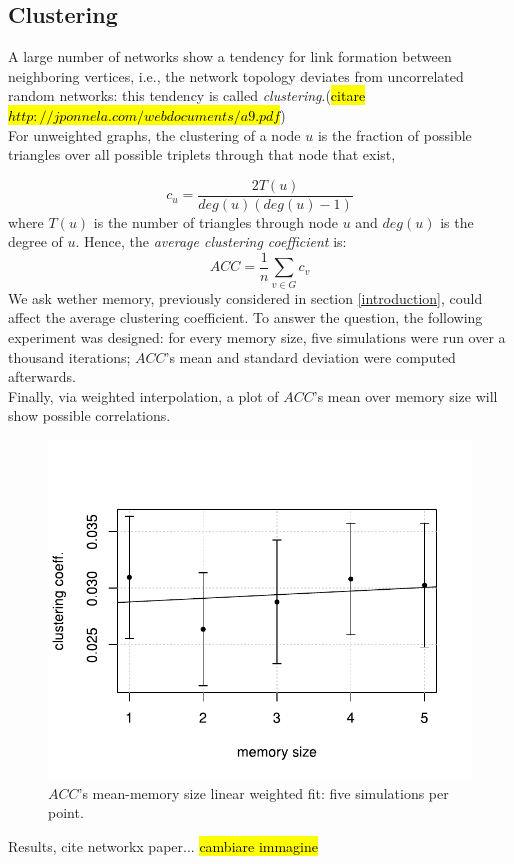 \subsection{Clustering} \label{clustering}
A large number of networks show a tendency for link formation between neighboring vertices, i.e., the network topology deviates from uncorrelated random networks: this tendency is called \textit{clustering}.(\hl{citare $http://jponnela.com/webdocuments/a9.pdf$}) \\
For unweighted graphs, the clustering of a node $u$ is the fraction of possible triangles over all possible triplets  through that node that exist,

\begin{equation}
\label{eq:clustering}
c_u = \frac{2 T(u)}{deg(u)(deg(u)-1)}
\end{equation}
where $T(u)$ is the number of triangles through node $u$ and $deg(u)$ is the degree of $u$.
Hence, the \textit{average clustering coefficient}  is:
\begin{equation}
\label{eq:average_clustering}
ACC = \frac{1}{n}\sum_{v \in G} c_v
\end{equation}
We ask wether memory, previously considered in section \ref{introduction}, could affect the average clustering coefficient.
To answer the question, the following experiment was designed:
for every memory size, five simulations were run over a thousand iterations; $ACC$'s mean and standard deviation were computed afterwards.\\
Finally, via weighted interpolation, a plot of $ACC$'s mean over memory size will show possible correlations.
\begin{figure}[h]
  \centering
  \includegraphics[trim={0cm 0cm 0cm 1cm},clip,width=.8\columnwidth]{img/clustering.pdf}
  \caption{$ACC$'s mean-memory size linear weighted fit: five simulations per point.}
  \label{fig:clustering}
\end{figure}
Results, cite networkx paper...
\hl{cambiare immagine}